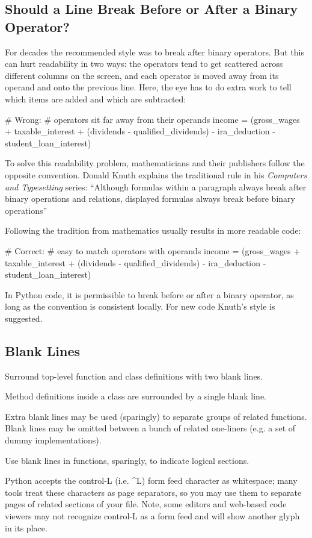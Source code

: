 \documentclass[a4paper,11pt]{article}
\begin{document}
\subsection{Should a Line Break Before or After a Binary Operator?}
For decades the recommended style was to break after binary operators. But this
can hurt readability in two ways: the operators tend to get scattered across
different columns on the screen, and each operator is moved away from its
operand and onto the previous line. Here, the eye has to do extra work to tell
which items are added and which are subtracted:
\par
\begin{python}
# Wrong:
# operators sit far away from their operands
income = (gross_wages +
          taxable_interest +
          (dividends - qualified_dividends) -
          ira_deduction -
          student_loan_interest)
\end{python}
To solve this readability problem, mathematicians and their publishers follow
the opposite convention. Donald Knuth explains the traditional rule in his
{\it Computers and Typesetting} series: “Although formulas within a paragraph
always break after binary operations and relations, displayed formulas always
break before binary operations”~\cite{Knuth-1986}
\par
Following the tradition from mathematics usually results in more readable code:
\par
\begin{python}
# Correct:
# easy to match operators with operands
income = (gross_wages
          + taxable_interest
          + (dividends - qualified_dividends)
          - ira_deduction
          - student_loan_interest)
\end{python}
In Python code, it is permissible to break before or after a binary operator, as
long as the convention is consistent locally. For new code Knuth’s style is
suggested.
\par
\subsection{Blank Lines}
Surround top-level function and class definitions with two blank lines.
\par
Method definitions inside a class are surrounded by a single blank line.
\par
Extra blank lines may be used (sparingly) to separate groups of related
functions. Blank lines may be omitted between a bunch of related one-liners
(e.g. a set of dummy implementations).
\par
Use blank lines in functions, sparingly, to indicate logical sections.
\par
Python accepts the control-L (i.e. \textasciicircum L) form feed character as
whitespace; many tools treat these characters as page separators, so you may use
them to separate pages of related sections of your file. Note, some editors and
web-based code viewers may not recognize control-L as a form feed and will show
another glyph in its place.
\par
\end{document}
